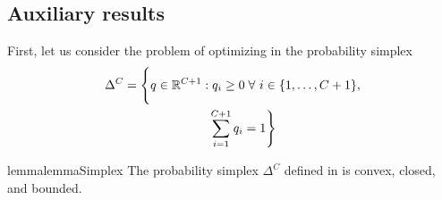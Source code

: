 \subsection{Auxiliary results}
\label{subsec:auxiliary_results}
First, let us consider the problem of optimizing  in the probability simplex
\begin{align}
    \label{eq:probability_simplex}
    \nonumber
    \Delta^{C} = \Bigg\{q \in \mathbb{R}^{C+1}: & \; q_i \ge 0 \; \forall\ i\in\{1, \dots, C+1\}, \\
                                                               & \sum_{i=1}^{C+1} q_i = 1 \Bigg\}
\end{align}
\begin{restatable}{lemma}{lemmaSimplex}
    \label{lemma:simplex_properties}
    The probability simplex \(\Delta^{C}\) defined in  is convex, closed, and bounded.
\end{restatable}

